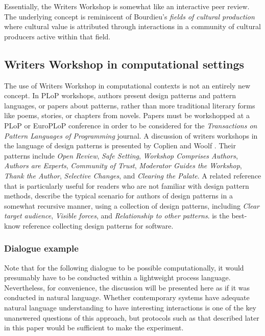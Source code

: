 Essentially, the Writers Workshop is somewhat like an interactive peer review. The underlying concept is reminiscent of Bourdieu's {\em fields of cultural production} \cite{bourdieu93} where cultural value is attributed through interactions in a community of cultural producers active within that field. 

\subsection{Writers Workshop in computational settings}
The use of Writers Workshop in computational contexts is not an
entirely new concept. In PLoP workshops, authors present design
patterns and pattern languages, or papers about patterns, rather than
more traditional literary forms like poems, stories, or chapters from
novels.  Papers must be workshopped at a PLoP or EuroPLoP conference
in order to be considered for the \emph{Transactions on Pattern
  Languages of Programming} journal.  A discussion of writers
workshops in the language of design patterns is presented by Coplien
and Woolf \citeyear{coplien1997pattern}.  Their patterns include
\emph{Open Review}, \emph{Safe Setting}, \emph{Workshop Comprises
  Authors}, \emph{Authors are Experts}, \emph{Community of Trust},
\emph{Moderator Guides the Workshop}, \emph{Thank the Author},
\emph{Selective Changes}, and \emph{Clearing the Palate}.
%
A related reference that is particularly useful for readers who are
not familiar with design pattern methods, 
describe the typical scenario for authors of design patterns in a
somewhat recursive manner, using a collection of design patterns,
including \emph{Clear target audience}, \emph{Visible forces}, and
\emph{Relationship to other patterns}.   is the
best-know reference collecting design patterns for software.


\subsubsection{Dialogue example}
Note that for the following dialogue to be possible computationally,
it would presumably have to be conducted within a lightweight process
language.  Nevertheless, for convenience, the discussion will be
presented here as if it was conducted in natural language.  Whether
contemporary systems have adequate natural language understanding to
have interesting interactions is one of the key unanswered questions
of this approach, but protocols such as that described later in this
paper would be sufficient to make the experiment.

